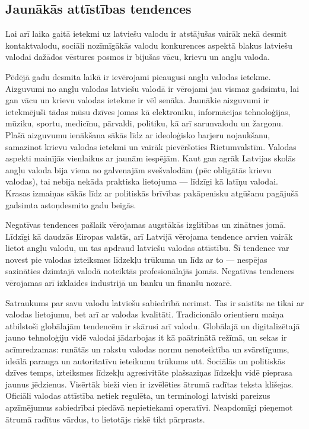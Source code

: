 \begin{multicols}{2}
\subsection{Jaunākās attīstības tendences}

Lai arī laika gaitā ietekmi uz latviešu valodu ir atstājušas vairāk nekā desmit kontaktvalodu, sociāli nozīmīgākās valodu konkurences aspektā blakus latviešu valodai dažādos vēstures posmos ir bijušas vācu, krievu un angļu valoda.

Pēdējā gadu desmita laikā ir ievērojami pieaugusi angļu valodas ietekme.
Aizguvumi no angļu valodas latviešu valodā ir vērojami jau vismaz gadsimtu, lai gan vācu un krievu valodas ietekme ir vēl senāka.
Jaunākie aizguvumi ir ietekmējuši tādas mūsu dzīves jomas kā elektroniku, informācijas tehnoloģijas, mūziku, sportu, medicīnu, pārvaldi, politiku, kā arī sarunvalodu un žargonu.
Plašā aizguvumu ienākšana sākās līdz ar ideoloģisko barjeru nojaukšanu, samazinot krievu valodas ietekmi un vairāk pievēršoties Rietumvalstīm.
Valodas aspekti mainījās vienlaikus ar jaunām iespējām.
Kaut gan agrāk Latvijas skolās angļu valoda bija viena no galvenajām svešvalodām (pēc obligātās krievu valodas), tai nebija nekāda praktiska lietojuma --- līdzīgi kā latīņu valodai. 
Krasas izmaiņas sākās līdz ar politiskās brīvības pakāpenisku atgūšanu pagājušā gadsimta astoņdesmito gadu beigās.

Negatīvas tendences pašlaik vērojamas augstākās izglītības un zinātnes jomā. 
Līdzīgi kā daudzās Eiropas valstīs, arī Latvijā vērojama tendence arvien vairāk lietot angļu valodu, un tas apdraud latviešu valodas attīstību. 
Šī tendence var novest pie valodas izteiksmes līdzekļu trūkuma un līdz ar to --- nespējas sazināties dzimtajā valodā noteiktās profesionālajās jomās. 
Negatīvas tendences vērojamas arī izklaides industrijā un banku un finanšu nozarē.

Satraukums par savu valodu latviešu sabiedrībā nerimst. 
Tas ir saistīts ne tikai ar valodas lietojumu, bet arī ar valodas kvalitāti. 
Tradicionālo orientieru maiņa atbilstoši globālajām tendencēm ir skārusi arī valodu. 
Globālajā un digitalizētajā jauno tehnoloģiju vidē valodai jādarbojas it kā paātrinātā režīmā, un sekas ir acīmredzamas: runātās un rakstu valodas normu nenoteiktība un svārstīgums, ideālā parauga un autoritatīvu ieteikumu trūkums utt. 
Sociālās un politiskās dzīves temps, izteiksmes līdzekļu agresivitāte plašsaziņas līdzekļu vidē pieprasa jaunus jēdzienus. 
Visērtāk bieži vien ir izvēlēties ātrumā radītas teksta klišejas. 
Oficiāli valodas attīstība netiek regulēta, un terminologi latviski pareizus apzīmējumus sabiedrībai piedāvā nepietiekami operatīvi.
Neapdomīgi pieņemot ātrumā radītus vārdus, to lietotājs riskē tikt pārprasts. 


\end{multicols}
